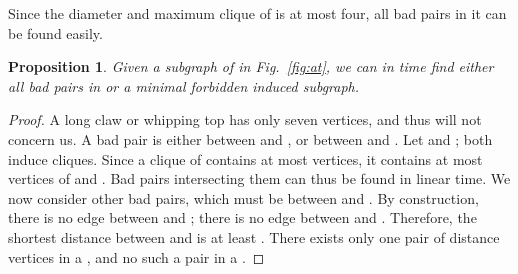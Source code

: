 \documentclass[10pt]{article}
\newtheorem{proposition}[theorem]{Proposition}
\newcommand{\badgraph}{minimal forbidden induced subgraph}
\begin{document}
Since the diameter and maximum clique of  is at most four, all bad
pairs in it can be found easily.
\begin{proposition}\label{lem:find-bad-pair}
  Given a subgraph  of  in Fig.~\ref{fig:at}, we can in
   time find either all bad pairs in  or a \badgraph.
\end{proposition}
\begin{proof}
  A long claw or whipping top has only seven vertices, and thus will
  not concern us.  A bad pair is either between  and , or
  between  and .  Let  and ; both induce cliques.  Since a clique of 
  contains at most  vertices, it contains at most  vertices of
   and .  Bad pairs intersecting them
  can thus be found in linear time.  We now consider other bad pairs,
  which must be between  and .  By construction, there is no edge between
   and ; there is no
  edge between  and .
  Therefore, the shortest distance between 
  and  is at least .  There exists only
  one pair of distance  vertices in a , and no such a pair in
  a .
\end{proof}
\end{document}
